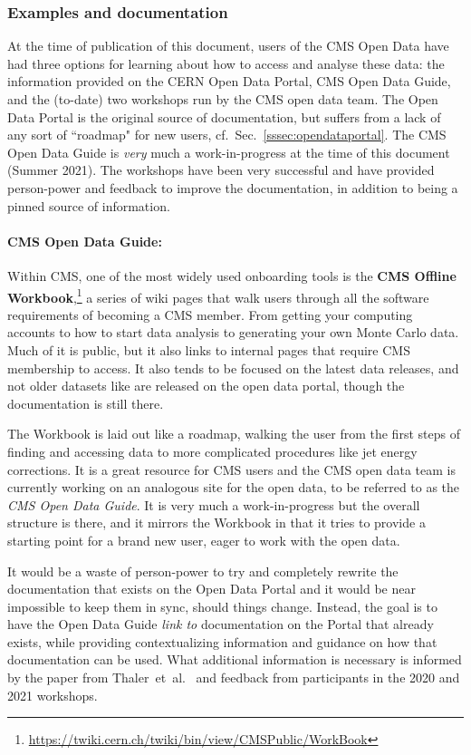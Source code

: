 \documentclass[10pt]{article}
\begin{document}
\subsubsection{Examples and documentation}
\label{sec:cms:examples}
%
At the time of publication of this document, users of the CMS Open Data have had three options for learning about how to access and analyse these data: the information provided on the CERN Open Data Portal, CMS Open Data Guide, and the (to-date) two workshops run by the CMS open data team. The Open Data Portal is the original source of documentation, but suffers from a lack of any sort of ``roadmap" for new users, cf.\ Sec.~\ref{sssec:opendataportal}. The CMS Open Data Guide is {\it very} much a work-in-progress at the time of this document (Summer 2021). The workshops have been very successful and have provided person-power and feedback to improve the documentation, in addition to being a pinned source of information.




\paragraph{CMS Open Data Guide:}
%
Within CMS, one of the most widely used onboarding tools is the {\bf CMS Offline Workbook},\footnote{\url{https://twiki.cern.ch/twiki/bin/view/CMSPublic/WorkBook}} a series of wiki pages that walk users through all the software requirements of becoming a CMS member. From getting your computing accounts to how to start data analysis to generating your own Monte Carlo data. Much of it is public, but it also links to internal pages that require CMS membership to access. It also tends to be focused on the latest data releases, and not older datasets like are released on the open data portal, though the documentation is still there. 

The Workbook is laid out like a roadmap, walking the user from the first steps of finding and accessing data to more complicated procedures like jet energy corrections. It is a great resource for CMS users and the CMS open data team is currently working on an analogous site for the open data, to be referred to as the {\it CMS Open Data Guide}. It is very much a work-in-progress but the overall structure is there, and it mirrors the Workbook in that it tries to provide a starting point for a brand new user, eager to work with the open data. 

It would be a waste of person-power to try and completely rewrite the documentation that exists on the Open Data Portal and it would be near impossible to keep them in sync, should things change. Instead, the goal is to have the Open Data Guide {\it link to} documentation on the Portal that already exists, while providing contextualizing information and guidance on how that documentation can be used. What additional information is necessary is informed by the paper from Thaler~et~al.~\cite{Tripathee:2017ybi} and feedback from participants in the 2020 and 2021 workshops. 
\end{document}
